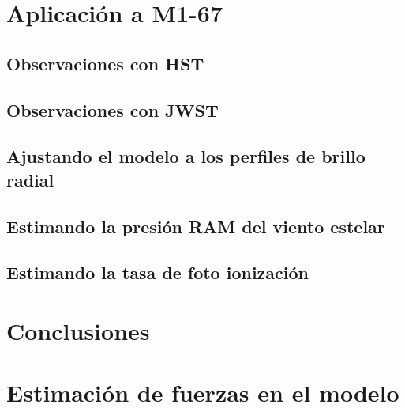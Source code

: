 \documentclass{book}
\begin{document}






\chapter{Aplicación a M1-67}

\section{Observaciones con HST}

\section{Observaciones con JWST}

\section{Ajustando el modelo a los perfiles de brillo radial}

\section{Estimando la presión RAM del viento estelar}

\section{Estimando la tasa de foto ionización}

\chapter{Conclusiones}

\appendix
\chapter{Estimación de fuerzas en el modelo}
\end{document}
